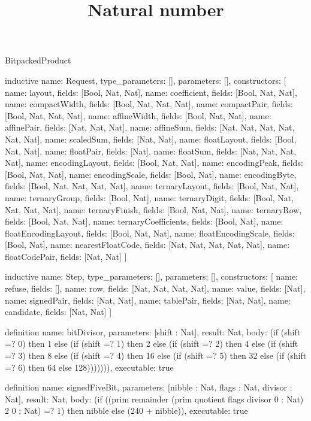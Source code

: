 \begin{lexlean}{BitpackedProduct}
\title{Natural number}
\begin{semanticmodule}
inductive{
  name: Request,
  type_parameters: [],
  parameters: [],
  constructors: [
    {name: layout, fields: [Bool, Nat, Nat]},
    {name: coefficient, fields: [Bool, Nat, Nat]},
    {name: compactWidth, fields: [Bool, Nat, Nat, Nat]},
    {name: compactPair, fields: [Bool, Nat, Nat, Nat]},
    {name: affineWidth, fields: [Bool, Nat, Nat]},
    {name: affinePair, fields: [Nat, Nat, Nat]},
    {name: affineSum, fields: [Nat, Nat, Nat, Nat, Nat, Nat]},
    {name: scaledSum, fields: [Nat, Nat]},
    {name: floatLayout, fields: [Bool, Nat, Nat]},
    {name: floatPair, fields: [Nat]},
    {name: floatSum, fields: [Nat, Nat, Nat, Nat]},
    {name: encodingLayout, fields: [Bool, Nat, Nat]},
    {name: encodingPeak, fields: [Bool, Nat, Nat]},
    {name: encodingScale, fields: [Bool, Nat]},
    {name: encodingByte, fields: [Bool, Nat, Nat, Nat, Nat]},
    {name: ternaryLayout, fields: [Bool, Nat, Nat]},
    {name: ternaryGroup, fields: [Bool, Nat]},
    {name: ternaryDigit, fields: [Bool, Nat, Nat, Nat, Nat]},
    {name: ternaryFinish, fields: [Bool, Nat, Nat]},
    {name: ternaryRow, fields: [Bool, Nat, Nat]},
    {name: ternaryCoefficients, fields: [Bool, Nat]},
    {name: floatEncodingLayout, fields: [Bool, Nat, Nat]},
    {name: floatEncodingScale, fields: [Bool, Nat]},
    {name: nearestFloatCode, fields: [Nat, Nat, Nat, Nat, Nat]},
    {name: floatCodePair, fields: [Nat, Nat]}
  ]
}

inductive{
  name: Step,
  type_parameters: [],
  parameters: [],
  constructors: [
    {name: refuse, fields: []},
    {name: row, fields: [Nat, Nat, Nat, Nat]},
    {name: value, fields: [Nat]},
    {name: signedPair, fields: [Nat, Nat]},
    {name: tablePair, fields: [Nat, Nat]},
    {name: candidate, fields: [Nat, Nat]}
  ]
}

definition{
  name: bitDivisor,
  parameters: [shift : Nat],
  result: Nat,
  body: (if (shift =? 0) then 1 else (if (shift =? 1) then 2 else (if (shift =? 2) then 4 else (if (shift =? 3) then 8 else (if (shift =? 4) then 16 else (if (shift =? 5) then 32 else (if (shift =? 6) then 64 else 128))))))),
  executable: true
}

definition{
  name: signedFiveBit,
  parameters: [nibble : Nat, flags : Nat, divisor : Nat],
  result: Nat,
  body: (if ((prim remainder (prim quotient flags divisor 0 : Nat) 2 0 : Nat) =? 1) then nibble else (240 + nibble)),
  executable: true
}


\end{semanticmodule}
\end{lexlean}
